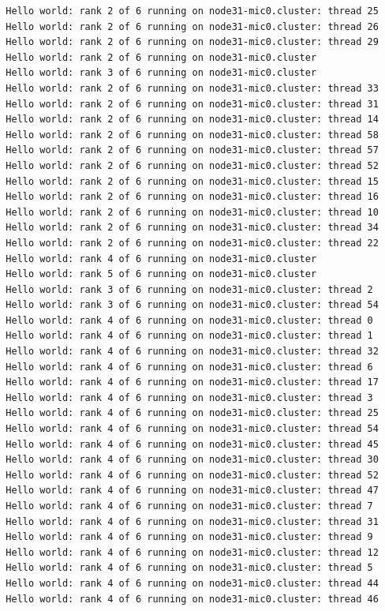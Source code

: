 \documentclass[pscyr,10pt]{hedlab}
\begin{document}
\begin{lstlisting}
  Hello world: rank 2 of 6 running on node31-mic0.cluster: thread 25
  Hello world: rank 2 of 6 running on node31-mic0.cluster: thread 26
  Hello world: rank 2 of 6 running on node31-mic0.cluster: thread 29
  Hello world: rank 2 of 6 running on node31-mic0.cluster
  Hello world: rank 3 of 6 running on node31-mic0.cluster
  Hello world: rank 2 of 6 running on node31-mic0.cluster: thread 33
  Hello world: rank 2 of 6 running on node31-mic0.cluster: thread 31
  Hello world: rank 2 of 6 running on node31-mic0.cluster: thread 14
  Hello world: rank 2 of 6 running on node31-mic0.cluster: thread 58
  Hello world: rank 2 of 6 running on node31-mic0.cluster: thread 57
  Hello world: rank 2 of 6 running on node31-mic0.cluster: thread 52
  Hello world: rank 2 of 6 running on node31-mic0.cluster: thread 15
  Hello world: rank 2 of 6 running on node31-mic0.cluster: thread 16
  Hello world: rank 2 of 6 running on node31-mic0.cluster: thread 10
  Hello world: rank 2 of 6 running on node31-mic0.cluster: thread 34
  Hello world: rank 2 of 6 running on node31-mic0.cluster: thread 22
  Hello world: rank 4 of 6 running on node31-mic0.cluster
  Hello world: rank 5 of 6 running on node31-mic0.cluster
  Hello world: rank 3 of 6 running on node31-mic0.cluster: thread 2
  Hello world: rank 3 of 6 running on node31-mic0.cluster: thread 54
  Hello world: rank 4 of 6 running on node31-mic0.cluster: thread 0
  Hello world: rank 4 of 6 running on node31-mic0.cluster: thread 1
  Hello world: rank 4 of 6 running on node31-mic0.cluster: thread 32
  Hello world: rank 4 of 6 running on node31-mic0.cluster: thread 6
  Hello world: rank 4 of 6 running on node31-mic0.cluster: thread 17
  Hello world: rank 4 of 6 running on node31-mic0.cluster: thread 3
  Hello world: rank 4 of 6 running on node31-mic0.cluster: thread 25
  Hello world: rank 4 of 6 running on node31-mic0.cluster: thread 54
  Hello world: rank 4 of 6 running on node31-mic0.cluster: thread 45
  Hello world: rank 4 of 6 running on node31-mic0.cluster: thread 30
  Hello world: rank 4 of 6 running on node31-mic0.cluster: thread 52
  Hello world: rank 4 of 6 running on node31-mic0.cluster: thread 47
  Hello world: rank 4 of 6 running on node31-mic0.cluster: thread 7
  Hello world: rank 4 of 6 running on node31-mic0.cluster: thread 31
  Hello world: rank 4 of 6 running on node31-mic0.cluster: thread 9
  Hello world: rank 4 of 6 running on node31-mic0.cluster: thread 12
  Hello world: rank 4 of 6 running on node31-mic0.cluster: thread 5
  Hello world: rank 4 of 6 running on node31-mic0.cluster: thread 44
  Hello world: rank 4 of 6 running on node31-mic0.cluster: thread 46

\end{lstlisting}
\end{document}
